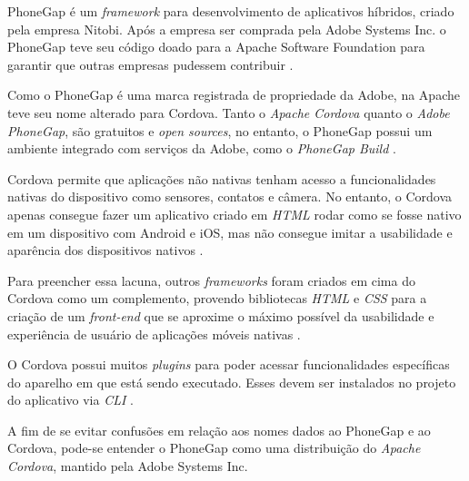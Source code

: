 PhoneGap é um \textit{framework} para desenvolvimento de aplicativos híbridos, criado pela empresa Nitobi. 
Após a empresa ser comprada pela Adobe Systems Inc. o PhoneGap teve seu código doado para a Apache Software Foundation 
para garantir que outras empresas pudessem contribuir \cite{bezerra_desenvolvimento_2016}.%


Como o PhoneGap é uma marca registrada de propriedade da Adobe, na Apache teve seu nome alterado para Cordova.
Tanto o \textit{Apache Cordova} quanto o \textit{Adobe PhoneGap}, são gratuitos e \textit{open sources}, no entanto, o 
PhoneGap possui um ambiente integrado com serviços da Adobe, como o \textit{PhoneGap Build} \cite{bezerra_desenvolvimento_2016}.
 
Cordova permite que aplicações não nativas tenham acesso a funcionalidades nativas do dispositivo como sensores, 
contatos e câmera. No entanto, o Cordova apenas consegue fazer um aplicativo criado em 
\textit{HTML} rodar como se fosse nativo em um dispositivo com Android e iOS, mas não consegue 
imitar a usabilidade e aparência dos dispositivos nativos \cite{bezerra_desenvolvimento_2016}. 

Para preencher essa lacuna, outros \textit{frameworks} foram criados em cima do Cordova como um complemento, 
provendo bibliotecas \textit{HTML} e \textit{CSS} para a 
criação de um \textit{front-end} que se aproxime o máximo possível da usabilidade e experiência de usuário de 
aplicações móveis nativas \cite{bezerra_desenvolvimento_2016}.

O Cordova possui muitos \textit{plugins} para poder acessar funcionalidades específicas do aparelho em que está sendo 
executado. Esses devem ser instalados no projeto do aplicativo via \textit{CLI} \cite{bezerra_desenvolvimento_2016}. 

A fim de se evitar confusões em relação aos nomes dados ao PhoneGap e ao Cordova, pode-se entender o PhoneGap 
como uma distribuição do \textit{Apache Cordova}, mantido pela Adobe Systems Inc. 



